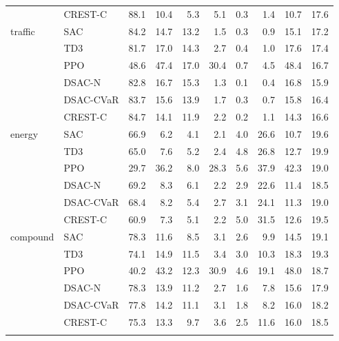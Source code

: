 \begin{table}[tb]
\begin{tabular}{llrrrrrrrr}
 & CREST-C & 88.1 & 10.4 & 5.3 & 5.1 & 0.3 & 1.4 & 10.7 & 17.6 \\
\addlinespace[2pt]
traffic & SAC & 84.2 & 14.7 & 13.2 & 1.5 & 0.3 & 0.9 & 15.1 & 17.2 \\
 & TD3 & 81.7 & 17.0 & 14.3 & 2.7 & 0.4 & 1.0 & 17.6 & 17.4 \\
 & PPO & 48.6 & 47.4 & 17.0 & 30.4 & 0.7 & 4.5 & 48.4 & 16.7 \\
 & DSAC-N & 82.8 & 16.7 & 15.3 & 1.3 & 0.1 & 0.4 & 16.8 & 15.9 \\
 & DSAC-CVaR & 83.7 & 15.6 & 13.9 & 1.7 & 0.3 & 0.7 & 15.8 & 16.4 \\
 & CREST-C & 84.7 & 14.1 & 11.9 & 2.2 & 0.2 & 1.1 & 14.3 & 16.6 \\
\addlinespace[2pt]
energy & SAC & 66.9 & 6.2 & 4.1 & 2.1 & 4.0 & 26.6 & 10.7 & 19.6 \\
 & TD3 & 65.0 & 7.6 & 5.2 & 2.4 & 4.8 & 26.8 & 12.7 & 19.9 \\
 & PPO & 29.7 & 36.2 & 8.0 & 28.3 & 5.6 & 37.9 & 42.3 & 19.0 \\
 & DSAC-N & 69.2 & 8.3 & 6.1 & 2.2 & 2.9 & 22.6 & 11.4 & 18.5 \\
 & DSAC-CVaR & 68.4 & 8.2 & 5.4 & 2.7 & 3.1 & 24.1 & 11.3 & 19.0 \\
 & CREST-C & 60.9 & 7.3 & 5.1 & 2.2 & 5.0 & 31.5 & 12.6 & 19.5 \\
\addlinespace[2pt]
compound & SAC & 78.3 & 11.6 & 8.5 & 3.1 & 2.6 & 9.9 & 14.5 & 19.1 \\
 & TD3 & 74.1 & 14.9 & 11.5 & 3.4 & 3.0 & 10.3 & 18.3 & 19.3 \\
 & PPO & 40.2 & 43.2 & 12.3 & 30.9 & 4.6 & 19.1 & 48.0 & 18.7 \\
 & DSAC-N & 78.3 & 13.9 & 11.2 & 2.7 & 1.6 & 7.8 & 15.6 & 17.9 \\
 & DSAC-CVaR & 77.8 & 14.2 & 11.1 & 3.1 & 1.8 & 8.2 & 16.0 & 18.2 \\
 & CREST-C & 75.3 & 13.3 & 9.7 & 3.6 & 2.5 & 11.6 & 16.0 & 18.5 \\
\addlinespace[2pt]
\bottomrule
\end{tabular}
\end{table}